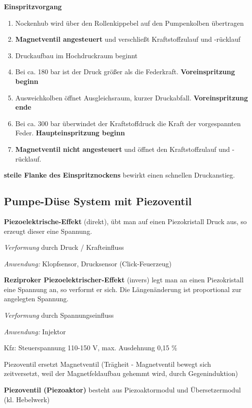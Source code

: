 \textbf{Einspritzvorgang}

\begin{enumerate}
\item
  Nockenhub wird über den Rollenkippebel auf den Pumpenkolben übertragen
\item
  \textbf{Magnetventil angesteuert} und verschließt Kraftstoffzulauf und
  -rücklauf
\item
  Druckaufbau im Hochdruckraum beginnt
\item
  Bei ca. 180 bar ist der Druck größer als die Federkraft.
  \textbf{Voreinspritzung beginn}
\item
  Ausweichkolben öffnet Ausgleichsraum, kurzer Druckabfall.
  \textbf{Voreinspritzung ende}
\item
  Bei ca. 300 bar überwindet der Kraftstoffdruck die Kraft der
  vorgespannten Feder. \textbf{Haupteinspritzung beginn}
\item
  \textbf{Magnetventil nicht angesteuert} und öffnet den
  Kraftstoffzulauf und -rücklauf.
\end{enumerate}

\textbf{steile Flanke des Einspritznockens} bewirkt einen schnellen
Druckanstieg.

\subsection{Pumpe-Düse System mit
Piezoventil}\label{pumpe-duese-system-mit-piezoventil}

\textbf{Piezoelektrische-Effekt} (direkt), übt man auf einen
Piezokristall Druck aus, so erzeugt dieser eine Spannung.

\emph{Verformung} durch Druck / Krafteinfluss

\emph{Anwendung:} Klopfsensor, Drucksensor (Click-Feuerzeug)

\textbf{Reziproker Piezoelektrischer-Effekt} (invers) legt man an einen
Piezokristall eine Spannung an, so verformt er sich. Die Längenänderung
ist proportional zur angelegten Spannung.

\emph{Verformung} durch Spannungseinfluss

\emph{Anwendung:} Injektor

Kfz: Steuerspannung 110-150 V, max. Ausdehnung 0,15 \%

Piezoventil ersetzt Magnetventil (Trägheit - Magnetventil bewegt sich
zeitversetzt, weil der Magnetfeldaufbau gehemmt wird, durch
Gegeninduktion)

\textbf{Piezoventil (Piezoaktor)} besteht aus Piezoaktormodul und
Übersetzermodul (kl. Hebelwerk)

